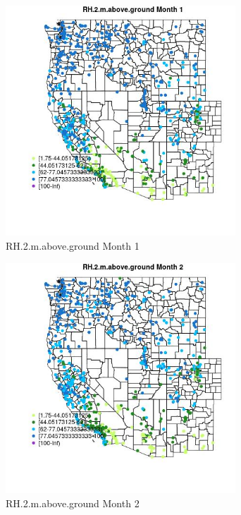 \begin{figure} 
\centering  
\includegraphics[width=0.77\textwidth]{Code_Outputs/Report_ML_input_PM25_Step4_part_e_de_duplicated_aves_compiled_2019-05-21wNAs_MapObsMo1RH2maboveground.jpg} 
\caption{\label{fig:Report_ML_input_PM25_Step4_part_e_de_duplicated_aves_compiled_2019-05-21wNAsMapObsMo1RH2maboveground}RH.2.m.above.ground Month 1} 
\end{figure} 
 

\begin{figure} 
\centering  
\includegraphics[width=0.77\textwidth]{Code_Outputs/Report_ML_input_PM25_Step4_part_e_de_duplicated_aves_compiled_2019-05-21wNAs_MapObsMo2RH2maboveground.jpg} 
\caption{\label{fig:Report_ML_input_PM25_Step4_part_e_de_duplicated_aves_compiled_2019-05-21wNAsMapObsMo2RH2maboveground}RH.2.m.above.ground Month 2} 
\end{figure} 
 

